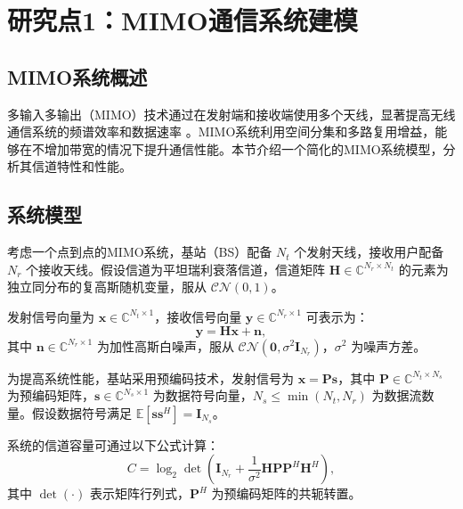 


\chapter{研究点1：MIMO通信系统建模}

\section{MIMO系统概述}

多输入多输出（MIMO）技术通过在发射端和接收端使用多个天线，显著提高无线通信系统的频谱效率和数据速率 \cite{cho2010mimo}。MIMO系统利用空间分集和多路复用增益，能够在不增加带宽的情况下提升通信性能。本节介绍一个简化的MIMO系统模型，分析其信道特性和性能。

\section{系统模型}

考虑一个点到点的MIMO系统，基站（BS）配备 \( N_t \) 个发射天线，接收用户配备 \( N_r \) 个接收天线。假设信道为平坦瑞利衰落信道，信道矩阵 \(\mathbf{H} \in \mathbb{C}^{N_r \times N_t}\) 的元素为独立同分布的复高斯随机变量，服从 \(\mathcal{CN}(0, 1)\)。

发射信号向量为 \(\mathbf{x} \in \mathbb{C}^{N_t \times 1}\)，接收信号向量 \(\mathbf{y} \in \mathbb{C}^{N_r \times 1}\) 可表示为：
\begin{equation}
  \mathbf{y} = \mathbf{H} \mathbf{x} + \mathbf{n},
  \label{eq:mimo_channel}
\end{equation}
其中 \(\mathbf{n} \in \mathbb{C}^{N_r \times 1}\) 为加性高斯白噪声，服从 \(\mathcal{CN}(\mathbf{0}, \sigma^2 \mathbf{I}_{N_r})\)，\(\sigma^2\) 为噪声方差。

为提高系统性能，基站采用预编码技术，发射信号为 \(\mathbf{x} = \mathbf{P} \mathbf{s}\)，其中 \(\mathbf{P} \in \mathbb{C}^{N_t \times N_s}\) 为预编码矩阵，\(\mathbf{s} \in \mathbb{C}^{N_s \times 1}\) 为数据符号向量，\(N_s \leq \min(N_t, N_r)\) 为数据流数量。假设数据符号满足 \(\mathbb{E}[\mathbf{s} \mathbf{s}^H] = \mathbf{I}_{N_s}\)。

系统的信道容量可通过以下公式计算：
\begin{equation}
  C = \log_2 \det \left( \mathbf{I}_{N_r} + \frac{1}{\sigma^2} \mathbf{H} \mathbf{P} \mathbf{P}^H \mathbf{H}^H \right),
  \label{eq:capacity}
\end{equation}
其中 \(\det(\cdot)\) 表示矩阵行列式，\(\mathbf{P}^H\) 为预编码矩阵的共轭转置。

